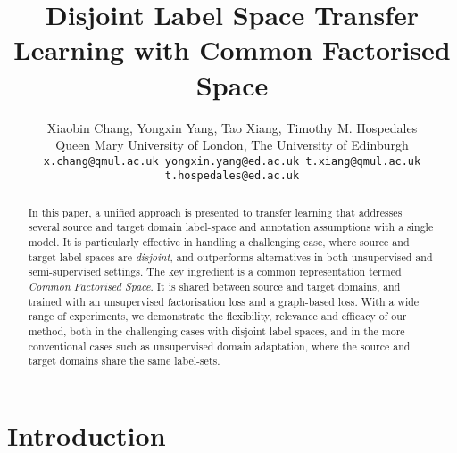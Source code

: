 \documentclass[letterpaper]{article} \usepackage{aaai19}  \usepackage{times}  \usepackage{helvet}  \usepackage{courier}  \usepackage{url}  \usepackage{graphicx}
\begin{document}
\title{Disjoint Label Space Transfer Learning with Common Factorised Space}


\author{Xiaobin Chang, Yongxin Yang, Tao Xiang, Timothy M. Hospedales\\
Queen Mary University of London, The University of Edinburgh\\
{\tt\small x.chang@qmul.ac.uk yongxin.yang@ed.ac.uk t.xiang@qmul.ac.uk t.hospedales@ed.ac.uk}
}


\maketitle
\begin{abstract}
In this paper, a unified approach is presented to transfer learning that addresses several source and target domain label-space and annotation assumptions with a single model. It is particularly effective in handling a challenging case, where source and target label-spaces are \emph{disjoint}, and outperforms alternatives in both unsupervised and semi-supervised settings. The key ingredient is a common representation termed \emph{Common Factorised Space}. It is shared between source and target domains, and trained with an unsupervised factorisation loss and a graph-based loss. 
With a wide range of experiments, we demonstrate the flexibility, relevance and efficacy of our method, both in the challenging cases with disjoint label spaces, and in the more conventional cases such as unsupervised domain adaptation, where the source and target domains share the same label-sets.



\end{abstract}

\section{Introduction}\label{Sec:Into}
\end{document}
